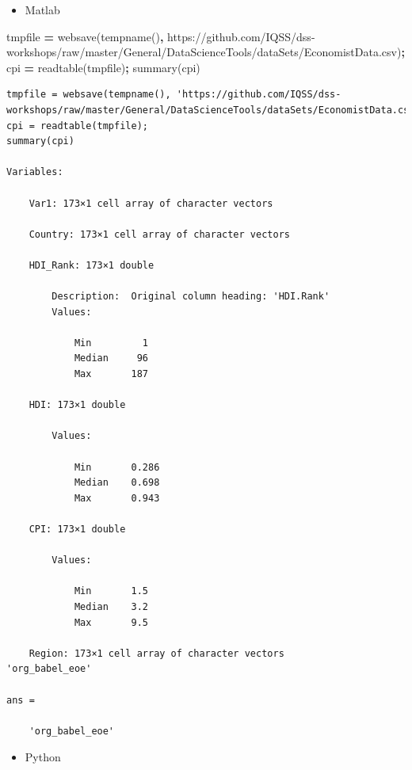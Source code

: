 \documentclass[
]{book}
\newenvironment{Shaded}{\begin{snugshade}}{\end{snugshade}}
\newcommand{\NormalTok}[1]{#1}
\newcommand{\OperatorTok}[1]{\textcolor[rgb]{0.81,0.36,0.00}{\textbf{#1}}}
\newcommand{\SpecialStringTok}[1]{\textcolor[rgb]{0.31,0.60,0.02}{#1}}
\newcommand{\VariableTok}[1]{\textcolor[rgb]{0.00,0.00,0.00}{#1}}
\providecommand{\tightlist}{%
  \setlength{\itemsep}{0pt}\setlength{\parskip}{0pt}}
\begin{document}
\begin{itemize}
\tightlist
\item
  Matlab
\end{itemize}

\begin{Shaded}
\begin{Highlighting}[]
\VariableTok{tmpfile} \OperatorTok{=} \VariableTok{websave}\NormalTok{(}\VariableTok{tempname}\NormalTok{()}\OperatorTok{,} \SpecialStringTok{\textquotesingle{}https://github.com/IQSS/dss{-}workshops/raw/master/General/DataScienceTools/dataSets/EconomistData.csv\textquotesingle{}}\NormalTok{)}\OperatorTok{;}
\VariableTok{cpi} \OperatorTok{=} \VariableTok{readtable}\NormalTok{(}\VariableTok{tmpfile}\NormalTok{)}\OperatorTok{;}
\VariableTok{summary}\NormalTok{(}\VariableTok{cpi}\NormalTok{)}
\end{Highlighting}
\end{Shaded}

\begin{verbatim}
tmpfile = websave(tempname(), 'https://github.com/IQSS/dss-workshops/raw/master/General/DataScienceTools/dataSets/EconomistData.csv');
cpi = readtable(tmpfile);
summary(cpi)

Variables:

    Var1: 173×1 cell array of character vectors

    Country: 173×1 cell array of character vectors

    HDI_Rank: 173×1 double

        Description:  Original column heading: 'HDI.Rank'
        Values:

            Min         1       
            Median     96       
            Max       187       

    HDI: 173×1 double

        Values:

            Min       0.286
            Median    0.698
            Max       0.943

    CPI: 173×1 double

        Values:

            Min       1.5  
            Median    3.2  
            Max       9.5  

    Region: 173×1 cell array of character vectors
'org_babel_eoe'

ans =

    'org_babel_eoe'
\end{verbatim}

\begin{itemize}
\tightlist
\item
  Python
\end{itemize}
\end{document}
